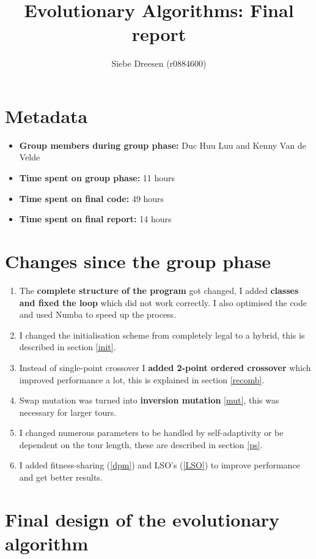\documentclass[a4paper,10pt]{article}
\title{Evolutionary Algorithms: Final report}
\author{{Siebe Dreesen (r0884600)}}
\begin{document}
\selectfont{}

\maketitle

\section{Metadata}

\begin{itemize}
\item \textbf{Group members during group phase:} Duc Huu Luu and Kenny Van de Velde
 \item \textbf{Time spent on group phase:} 11 hours
 \item \textbf{Time spent on final code:} 49 hours
 \item \textbf{Time spent on final report:} 14 hours
\end{itemize}

\section{Changes since the group phase} 

\begin{enumerate}
 \item The \textbf{complete structure of the program} got changed, I added \textbf{classes and fixed the loop} which did not work correctly. I also optimised the code and used Numba to speed up the process.
 \item I changed the initialisation scheme from completely legal to a hybrid, this is described in section \ref{init}.
 \item Instead of single-point crossover I \textbf{added 2-point ordered crossover} which improved performance a lot, this is explained in section \ref{recomb}.
 \item Swap mutation was turned into \textbf{inversion mutation} \ref{mut}, this was necessary for larger tours.
 \item I changed numerous parameters to be handled by self-adaptivity or be dependent on the tour length, these are described in section \ref{ps}.
 \item I added fitness-sharing (\ref{dpm}) and LSO's (\ref{LSO}) to improve performance and get better results.  
\end{enumerate}

\section{Final design of the evolutionary algorithm} 
\end{document}
